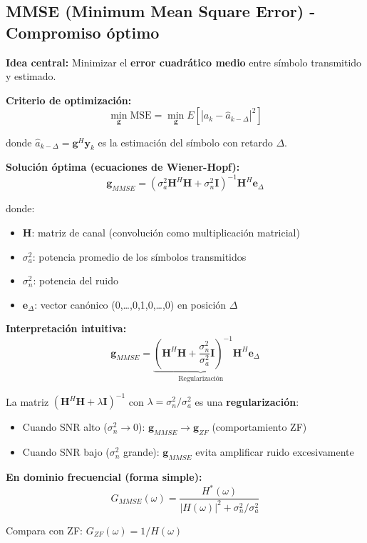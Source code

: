 \documentclass[10pt,a4paper]{article}
\begin{document}
\subsection{MMSE (Minimum Mean Square Error) - Compromiso óptimo}

\textbf{Idea central:} Minimizar el \textbf{error cuadrático medio} entre símbolo transmitido y estimado.

\textbf{Criterio de optimización:}
$$\min_{\mathbf{g}} \text{MSE} = \min_{\mathbf{g}} E\left[|a_k - \hat{a}_{k-\Delta}|^2\right]$$

donde $\hat{a}_{k-\Delta} = \mathbf{g}^H \mathbf{y}_k$ es la estimación del símbolo con retardo $\Delta$.

\textbf{Solución óptima (ecuaciones de Wiener-Hopf):}
$$\boxed{\mathbf{g}_{MMSE} = (\sigma_a^2 \mathbf{H}^H\mathbf{H} + \sigma_n^2\mathbf{I})^{-1}\mathbf{H}^H\mathbf{e}_{\Delta}}$$

donde:
\begin{itemize}
\item $\mathbf{H}$: matriz de canal (convolución como multiplicación matricial)
\item $\sigma_a^2$: potencia promedio de los símbolos transmitidos
\item $\sigma_n^2$: potencia del ruido
\item $\mathbf{e}_{\Delta}$: vector canónico (0,\ldots,0,1,0,\ldots,0) en posición $\Delta$
\end{itemize}

\textbf{Interpretación intuitiva:}
$$\mathbf{g}_{MMSE} = \underbrace{(\mathbf{H}^H\mathbf{H} + \frac{\sigma_n^2}{\sigma_a^2}\mathbf{I})^{-1}\mathbf{H}^H}_{\text{Regularización}} \mathbf{e}_{\Delta}$$

La matriz $(\mathbf{H}^H\mathbf{H} + \lambda\mathbf{I})^{-1}$ con $\lambda = \sigma_n^2/\sigma_a^2$ es una \textbf{regularización}:
\begin{itemize}
\item Cuando SNR alto ($\sigma_n^2 \to 0$): $\mathbf{g}_{MMSE} \to \mathbf{g}_{ZF}$ (comportamiento ZF)
\item Cuando SNR bajo ($\sigma_n^2$ grande): $\mathbf{g}_{MMSE}$ evita amplificar ruido excesivamente
\end{itemize}

\textbf{En dominio frecuencial (forma simple):}
$$G_{MMSE}(\omega) = \frac{H^*(\omega)}{|H(\omega)|^2 + \sigma_n^2/\sigma_a^2}$$

Compara con ZF: $G_{ZF}(\omega) = 1/H(\omega)$
\end{document}
